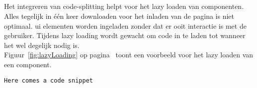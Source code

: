 \subsection{}
\label{sec:lazy}

Het integreren van code-splitting helpt voor het lazy loaden van componenten. Alles tegelijk in één keer downloaden voor het inladen van de pagina is niet optimaal. \gls{ui} elementen worden ingeladen zonder dat er ooit interactie is met de gebruiker. Tijdens lazy loading wordt gewacht om code in te laden tot wanneer het wel degelijk nodig is.\\
Figuur~\ref{fig:lazyLoading} op pagina~\pageref{fig:lazyLoading} toont een voorbeeld voor het lazy loaden van een component.

\begin{lstlisting}[caption=Lazy loading a component, label={fig:lazyLoading}]
    Here comes a code snippet
\end{lstlisting}




\section{}
\label{sec:frameworkOplossingen}

\subsection{}
\label{sec:propagatie}

